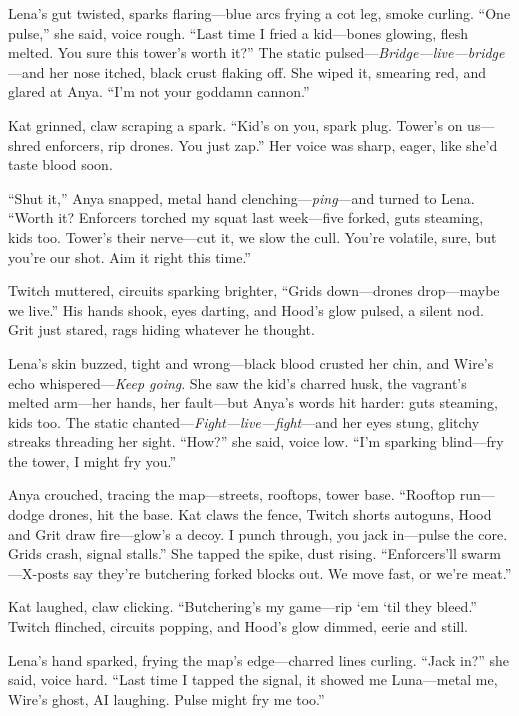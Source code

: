 \documentclass[12pt]{book}
\begin{document}
Lena’s gut twisted, sparks flaring---blue arcs frying a cot leg, smoke curling. ``One pulse,'' she said, voice rough. ``Last time I fried a kid---bones glowing, flesh melted. You sure this tower’s worth it?'' The static pulsed---\emph{Bridge---live---bridge}---and her nose itched, black crust flaking off. She wiped it, smearing red, and glared at Anya. ``I’m not your goddamn cannon.''

Kat grinned, claw scraping a spark. ``Kid’s on you, spark plug. Tower’s on us---shred enforcers, rip drones. You just zap.'' Her voice was sharp, eager, like she’d taste blood soon.

``Shut it,'' Anya snapped, metal hand clenching---\emph{ping}---and turned to Lena. ``Worth it? Enforcers torched my squat last week---five forked, guts steaming, kids too. Tower’s their nerve---cut it, we slow the cull. You’re volatile, sure, but you’re our shot. Aim it right this time.''

Twitch muttered, circuits sparking brighter, ``Grids down---drones drop---maybe we live.'' His hands shook, eyes darting, and Hood’s glow pulsed, a silent nod. Grit just stared, rags hiding whatever he thought.

Lena’s skin buzzed, tight and wrong---black blood crusted her chin, and Wire’s echo whispered---\emph{Keep going}. She saw the kid’s charred husk, the vagrant’s melted arm---her hands, her fault---but Anya’s words hit harder: guts steaming, kids too. The static chanted---\emph{Fight---live---fight}---and her eyes stung, glitchy streaks threading her sight. ``How?'' she said, voice low. ``I’m sparking blind---fry the tower, I might fry you.''

Anya crouched, tracing the map---streets, rooftops, tower base. ``Rooftop run---dodge drones, hit the base. Kat claws the fence, Twitch shorts autoguns, Hood and Grit draw fire---glow’s a decoy. I punch through, you jack in---pulse the core. Grids crash, signal stalls.'' She tapped the spike, dust rising. ``Enforcers’ll swarm---X-posts say they’re butchering forked blocks out. We move fast, or we’re meat.''

Kat laughed, claw clicking. ``Butchering’s my game---rip ‘em ‘til they bleed.'' Twitch flinched, circuits popping, and Hood’s glow dimmed, eerie and still.

Lena’s hand sparked, frying the map’s edge---charred lines curling. ``Jack in?'' she said, voice hard. ``Last time I tapped the signal, it showed me Luna---metal me, Wire’s ghost, AI laughing. Pulse might fry me too.''
\end{document}
